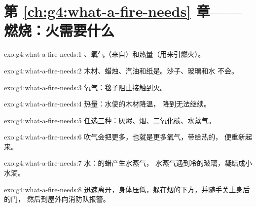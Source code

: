 \section*{第 \ref{ch:g4:what-a-fire-needs} 章——燃烧：火需要什么}

\begin{solution}{exo:g4:what-a-fire-needs:1}
、氧气（来自）和热量（用来引燃火）。
\end{solution}

\begin{solution}{exo:g4:what-a-fire-needs:2}
木材、蜡烛、汽油和纸是。沙子、玻璃和水
不会。
\end{solution}

\begin{solution}{exo:g4:what-a-fire-needs:3}
氧气：毯子阻止接触到火。
\end{solution}

\begin{solution}{exo:g4:what-a-fire-needs:4}
热量：水使的木材降温，
降到无法继续。
\end{solution}

\begin{solution}{exo:g4:what-a-fire-needs:5}
任选三种：灰烬、烟、二氧化碳、水蒸气。
\end{solution}

\begin{solution}{exo:g4:what-a-fire-needs:6}
吹气会把更多，也就是更多氧气，带给热的，
便重新起来。
\end{solution}

\begin{solution}{exo:g4:what-a-fire-needs:7}
水：的蜡产生水蒸气，
水蒸气遇到冷的玻璃，凝结成小水滴。
\end{solution}

\begin{solution}{exo:g4:what-a-fire-needs:8}
迅速离开，身体压低，躲在烟的下方，并随手关上身后的门，
然后到屋外向消防队报警。
\end{solution}

